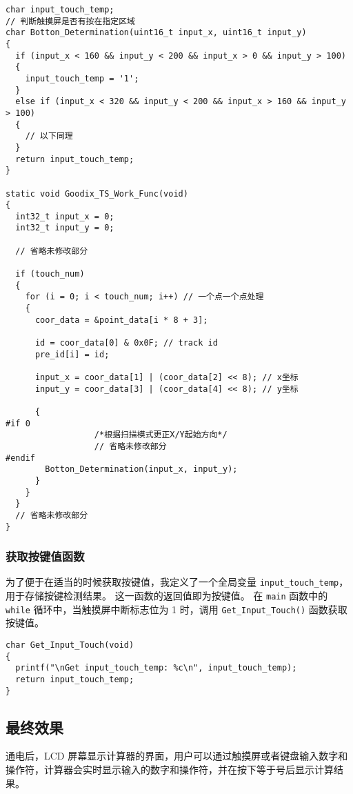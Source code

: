 \documentclass{theme-2639013-final}
\begin{document}
\begin{verbatim}
char input_touch_temp;
// 判断触摸屏是否有按在指定区域
char Botton_Determination(uint16_t input_x, uint16_t input_y)
{
  if (input_x < 160 && input_y < 200 && input_x > 0 && input_y > 100)
  {
    input_touch_temp = '1';
  }
  else if (input_x < 320 && input_y < 200 && input_x > 160 && input_y > 100)
  {
    // 以下同理
  }
  return input_touch_temp;
}

static void Goodix_TS_Work_Func(void)
{
  int32_t input_x = 0;
  int32_t input_y = 0;
  
  // 省略未修改部分

  if (touch_num)
  {
    for (i = 0; i < touch_num; i++) // 一个点一个点处理
    {
      coor_data = &point_data[i * 8 + 3];

      id = coor_data[0] & 0x0F; // track id
      pre_id[i] = id;

      input_x = coor_data[1] | (coor_data[2] << 8); // x坐标
      input_y = coor_data[3] | (coor_data[4] << 8); // y坐标

      {
#if 0
                  /*根据扫描模式更正X/Y起始方向*/
                  // 省略未修改部分
#endif
        Botton_Determination(input_x, input_y);
      }
    }
  }
  // 省略未修改部分
}
\end{verbatim}

\subsubsection{获取按键值函数}

为了便于在适当的时候获取按键值，我定义了一个全局变量 \texttt{input\_touch\_temp}，用于存储按键检测结果。
这一函数的返回值即为按键值。
在 \texttt{main} 函数中的 \texttt{while} 循环中，当触摸屏中断标志位为 1 时，调用 \texttt{Get\_Input\_Touch()} 函数获取按键值。

\begin{verbatim}
char Get_Input_Touch(void)
{
  printf("\nGet input_touch_temp: %c\n", input_touch_temp);
  return input_touch_temp;
}
\end{verbatim}

\subsection{最终效果}

通电后，LCD 屏幕显示计算器的界面，用户可以通过触摸屏或者键盘输入数字和操作符，计算器会实时显示输入的数字和操作符，并在按下等于号后显示计算结果。
\end{document}
